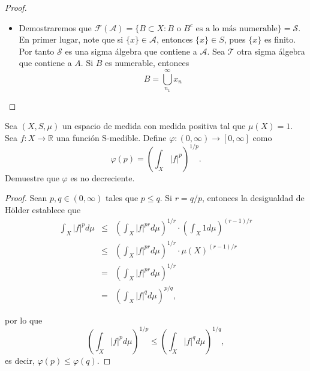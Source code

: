 \documentclass[12pt]{article}
\newcommand{\R}{\mathbb{R}}
\newenvironment{problem}[2][Problema]{\begin{trivlist}
\item[\hskip \labelsep {\bfseries #1}\hskip \labelsep {\bfseries #2.}]}{\end{trivlist}}
\begin{document}
\begin{proof} \text{ }
    \begin{itemize} 
        \item[a)] Demostraremos que $\mathcal{F}(\mathcal{A}) = \{B \subset X: B \text{ o } B^c \text{ es a lo más numerable} \} = \mathcal{S}.$ En primer lugar, note que si $\{x\} \in \mathcal{A}$, entonces $\{x\} \in S$, pues $\{x\}$ es finito. Por tanto $\mathcal{S}$ es una sigma álgebra que contiene a $\mathcal{A}$. Sea $\mathcal{T}$ otra sigma álgebra que contiene a $A$. Si $B$ es numerable, entonces 
        $$ B = \bigcup_{n_1}^\infty x_n $$
    \end{itemize}
\end{proof}




\begin{problem}{23}
    Sea $(X, S, \mu)$ un espacio de medida con medida positiva tal que $\mu(X) = 1.$ Sea $f: X \rightarrow \R$ una función S-medible. Define $\varphi: (0, \infty) \rightarrow [0, \infty]$ como
    $$\varphi(p) = \left( \int_X | f |^p\right)^{1/p}.$$
    Demuestre que $\varphi$ es no decreciente. 
\end{problem}
\begin{proof}
    Sean $p,q \in (0, \infty)$ tales que $p \leq q.$ Si $r = q / p$, entonces la desigualdad de Hölder establece que 
    \begin{eqnarray*}
    \int_X \lvert f \rvert^p d \mu &\leq& \left( \int_X | f |^{pr} d\mu \right)^{1/r} \cdot \left(\int_X 1 d\mu \right)^{(r-1)/r}\\
    &\leq& \left( \int_X | f |^{pr} d\mu \right)^{1/r} \cdot \mu(X)^{(r-1)/r}\\
    &=& \left( \int_X | f |^{pr} d\mu \right)^{1/r}\\
    &=& \left( \int_X | f |^{q} d\mu \right)^{p/q},
    \end{eqnarray*}

    por lo que 
    $$\left(\int_X \lvert f \rvert^p d \mu \right)^{1/p} \leq \left( \int_X | f |^{q} d\mu \right)^{1/q},$$
    es decir, $\varphi(p) \leq \varphi(q).$
    
\end{proof}
\end{document}
